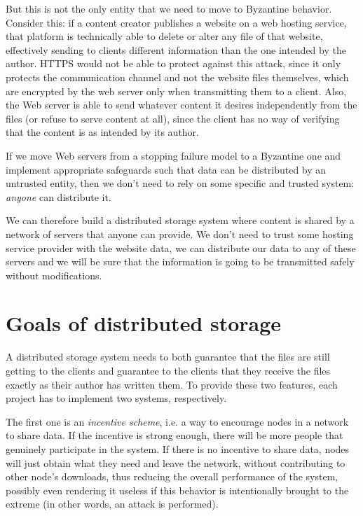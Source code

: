 \documentclass[mscthesis]{usiinfthesis}
\begin{document}
But this is not the only entity that we need to move to Byzantine behavior. Consider this: if a content creator publishes a website on a web hosting service, that platform is technically able to delete or alter any file of that website, effectively sending to clients different information than the one intended by the author. HTTPS would not be able to protect against this attack, since it only protects the communication channel and not the website files themselves, which are encrypted by the web server only when transmitting them to a client. Also, the Web server is able to send whatever content it desires independently from the files (or refuse to serve content at all), since the client has no way of verifying that the content is as intended by its author.

If we move Web servers from a stopping failure model to a Byzantine one and implement appropriate safeguards such that data can be distributed by an untrusted entity, then we don't need to rely on some specific and trusted system: \emph{anyone} can distribute it.

We can therefore build a distributed storage system where content is shared by a network of servers that anyone can provide. We don't need to trust some hosting service provider with the website data, we can distribute our data to any of these servers and we will be sure that the information is going to be transmitted safely without modifications.

\section{Goals of distributed storage}

A distributed storage system needs to both guarantee that the files are still getting to the clients and guarantee to the clients that they receive the files exactly as their author has written them. To provide these two features, each project has to implement two systems, respectively.

The first one is an \emph{incentive scheme}, i.e. a way to encourage nodes in a network to share data. If the incentive is strong enough, there will be more people that genuinely participate in the system. If there is no incentive to share data, nodes will just obtain what they need and leave the network, without contributing to other node's downloads, thus reducing the overall performance of the system, possibly even rendering it useless if this behavior is intentionally brought to the extreme (in other words, an attack is performed).
\end{document}
